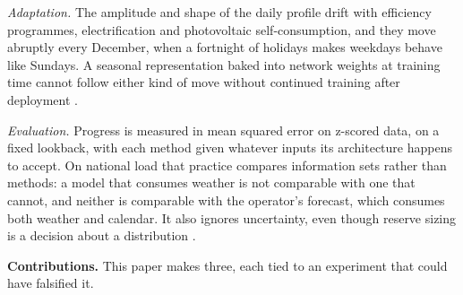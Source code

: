 \emph{Adaptation.} The amplitude and shape of the daily profile drift with efficiency
programmes, electrification and photovoltaic self-consumption, and they move abruptly every
December, when a fortnight of holidays makes weekdays behave like Sundays. A seasonal
representation baked into network weights at training time cannot follow either kind of move
without continued training after deployment \cite{kim2025tta}.

\emph{Evaluation.} Progress is measured in mean squared error on z-scored data, on a fixed
lookback, with each method given whatever inputs its architecture happens to accept. On
national load that practice compares information sets rather than methods: a model that
consumes weather is not comparable with one that cannot, and neither is comparable with the
operator's forecast, which consumes both weather and calendar. It also ignores uncertainty,
even though reserve sizing is a decision about a distribution \cite{gneiting2007scoring}.

\smallskip\noindent\textbf{Contributions.} This paper makes three, each tied to an experiment
that could have falsified it.

